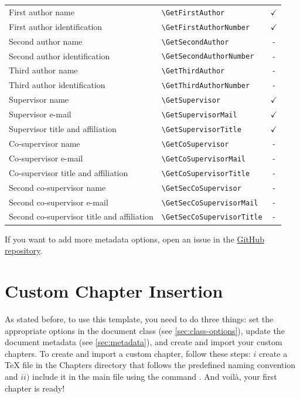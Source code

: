 \begin{longtable}[c]{llc}
First author name           & \verb|\GetFirstAuthor|        & $\checkmark$ \\
First author identification & \verb|\GetFirstAuthorNumber|  & $\checkmark$ \\ 

Second author name           & \verb|\GetSecondAuthor|          & - \\
Second author identification & \verb|\GetSecondAuthorNumber|    & - \\ 

Third author name           & \verb|\GetThirdAuthor|        & - \\
Third author identification & \verb|\GetThirdAuthorNumber|  & - \\ 

Supervisor name                  & \verb|\GetSupervisor|        & $\checkmark$ \\
Supervisor e-mail                & \verb|\GetSupervisorMail|    & $\checkmark$ \\
Supervisor title and affiliation & \verb|\GetSupervisorTitle|   & $\checkmark$ \\ 

Co-supervisor name                  & \verb|\GetCoSupervisor|       & - \\
Co-supervisor e-mail                & \verb|\GetCoSupervisorMail|   & - \\
Co-supervisor title and affiliation & \verb|\GetCoSupervisorTitle|  & - \\ 

Second co-supervisor name                   & \verb|\GetSecCoSupervisor|      & - \\
Second co-supervisor e-mail                 & \verb|\GetSecCoSupervisorMail|  & - \\
Second co-supervisor title and affiliation  & \verb|\GetSecCoSupervisorTitle| & - \\
\end{longtable}

If you want to add more metadata options, open an issue in the \href{https://github.com/pmdlt/epfl-thesis}{GitHub repository}.

\section{Custom Chapter Insertion}
As stated before, to use this template, you need to do three things: set the appropriate options in the document class (see \autoref{sec:class-options}), update the document metadata (see \autoref{sec:metadata}), and create and import your custom chapters. To create and import a custom chapter, follow these steps: \(i\) create a TeX file in the Chapters directory that follows the predefined naming convention and \(ii)\) include it in the main file using the command \verb||. And voilà, your first chapter is ready!

